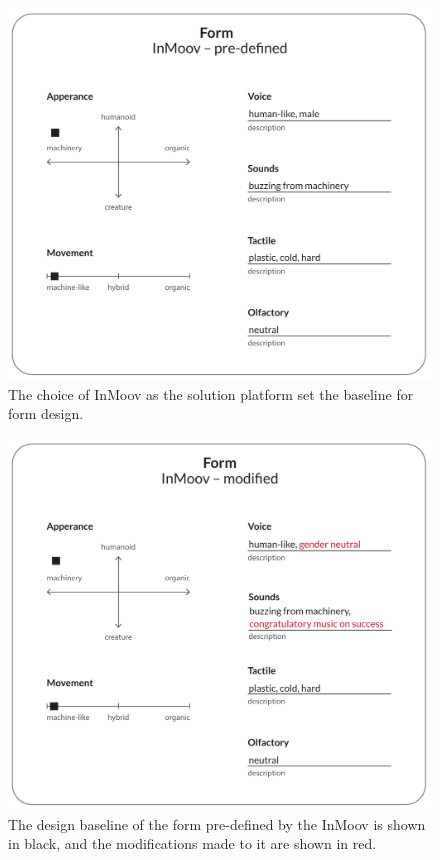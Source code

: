 \begin{figure}[htbp]
  \includegraphics[width=\linewidth]{images/solution_inmoov_predefined-02.pdf}
  \caption{The choice of InMoov as the solution platform set the baseline for form design.}
  \label{fig:formPredefined}
\end{figure}


\begin{figure}
  \includegraphics[width=\linewidth]{images/solution_inmoov_final-03.pdf}
  \caption{The design baseline of the form pre-defined by the InMoov is shown in black, and the modifications made to it are shown in red.}
  \label{fig:formFinal}
\end{figure}


